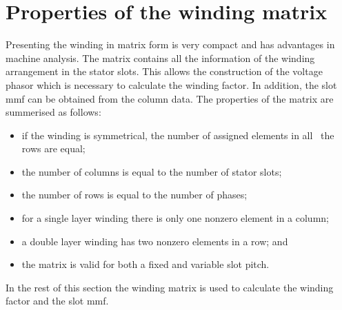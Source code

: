 \section{Properties of the winding matrix}
Presenting the winding in matrix form is very compact and has advantages in machine analysis. The matrix contains all the information of the winding arrangement in the stator slots. This allows the construction of the voltage phasor which is necessary to calculate the winding factor. In addition, the slot mmf can be obtained from the column data. The properties of the matrix are summerised as follows:
\begin{itemize}
	\item if the winding is symmetrical, the number of assigned elements in all~%
	the rows are equal;
	\item the number of columns is equal to the number of stator slots;
	\item the number of rows is equal to the number of phases;
	\item for a single layer winding there is only one nonzero element in a column;
	\item a double layer winding has two nonzero elements in a row; and
	\item the matrix is valid for both a fixed and variable slot pitch.
\end{itemize}
In the rest of this section the winding matrix is used to calculate the winding factor and the slot mmf.

